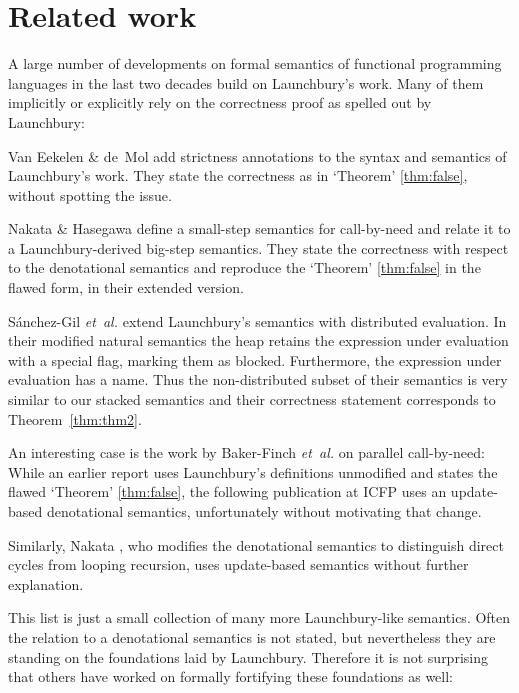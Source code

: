 \documentclass[twopage]{scrartcl}
\theoremstyle{nonumberbreak}
\newcommand{\shortcite}{\cite}
\begin{document}
\section{Related work}

A large number of developments on formal semantics of functional programming languages in the last two decades build on Launchbury’s work. Many of them implicitly or explicitly rely on the correctness proof as spelled out by Launchbury:

Van Eekelen \& de~Mol \shortcite{mixed} add strictness annotations to the syntax and semantics of Launchbury’s work. They state the correctness as in `Theorem' \ref{thm:false}, without spotting the issue.


Nakata \& Hasegawa \shortcite{nakata} define a small-step semantics for call-by-need and relate it to a Launchbury-derived big-step semantics. They state the correctness with respect to the denotational semantics and reproduce the `Theorem' \ref{thm:false} in the flawed form, in their extended version.

S{\'a}nchez-Gil {\em et~al.} \shortcite{distributed} extend Launchbury's semantics with distributed evaluation.  In their modified natural semantics the heap retains the expression under evaluation with a special flag, marking them as blocked. Furthermore, the expression under evaluation has a name. Thus the non-distributed subset of their semantics is very similar to our stacked semantics and their correctness statement corresponds to Theorem~\ref{thm:thm2}.

An interesting case is the work by Baker-Finch {\em et~al.} on parallel call-by-need: While an earlier report \shortcite{parallel-tr} uses Launchbury’s definitions unmodified and states the flawed `Theorem' \ref{thm:false}, the following publication at ICFP \shortcite{parallel} uses an update-based denotational semantics, unfortunately without motivating that change.

Similarly, Nakata  \shortcite{nakata_blackhole}, who modifies the denotational semantics to distinguish direct cycles from looping recursion, uses update-based semantics without further explanation. 

This list is just a small collection of many more Launchbury-like semantics. Often the relation to a denotational semantics is not stated, but nevertheless they are standing on the foundations laid by Launchbury. Therefore it is not surprising that others have worked on formally fortifying these foundations as well:
\end{document}
